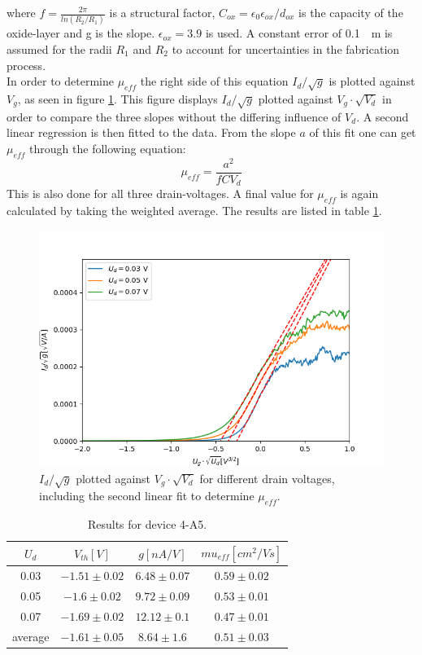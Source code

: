 \documentclass[%
 reprint,
amsmath,amssymb,
pra,
]{revtex4-1}
\begin{document}
where $f = \frac{2\pi}{ln(R_2/R_1)}$ is a structural factor, $C_{ox} = \epsilon_0 \epsilon_{ox} / d_{ox}$ is the capacity of the oxide-layer and g is the slope. $\epsilon_{ox} = 3.9$ is used. A constant error of \SI{0.1}{\mu m} is assumed for the radii $R_1$ and $R_2$ to account for uncertainties in the fabrication process.\\
In order to determine  $\mu_{eff}$ the right side of this equation $I_d/\sqrt{g}$ is plotted against $V_g$, as seen in figure \ref{fig:linreg2}. This figure displays $I_d/\sqrt{g}$ plotted against $V_g \cdot \sqrt{V_d}$ in order to compare the three slopes without the differing influence of $V_d$. A second linear regression is then fitted to the data. From the slope $a$ of this fit one can get $\mu_{eff}$ through the following equation:
\begin{equation}
\mu_{eff} = \dfrac{a^2}{f C V_d}
\end{equation}
This is also done for all three drain-voltages. A final value for $\mu_{eff}$ is again calculated by taking the weighted average. The results are listed in table \ref{tab:exaple_data}.
\begin{figure}
\centering
\includegraphics[scale=0.55]{Bilder/mu.png}
\caption{$I_d/\sqrt{g}$ plotted against $V_g \cdot \sqrt{V_d}$ for different drain voltages, including the second linear fit to determine $\mu_{eff}$.}
\label{fig:linreg2}
\end{figure}
\begin{table}
\centering
\begin{tabular}{|c|c|c|c|}
\hline
$U_d$ & $V_{th}[\si{V}]$ & $g[\si{nA/V}]$ & $mu_{eff}[\si{cm^2/Vs}]$\\
\hline
0.03 & $-1.51\pm 0.02$ & $6.48\pm 0.07$ & $0.59\pm 0.02$\\
\hline
0.05 & $-1.6\pm 0.02$ & $9.72\pm 0.09$ & $0.53\pm 0.01$\\
\hline
0.07 & $-1.69\pm 0.02$ & $12.12\pm 0.1$ & $0.47\pm 0.01$\\
\hline
average & $-1.61\pm 0.05$ & $8.64\pm 1.6$ &$0.51\pm 0.03$\\
\hline
\end{tabular}
\caption{Results for device 4-A5.}
\label{tab:exaple_data}
\end{table}
\end{document}
